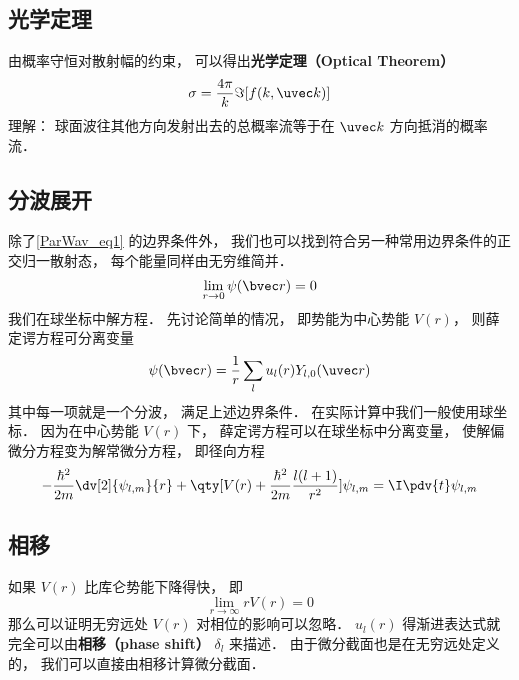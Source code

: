 \subsection{光学定理}
由概率守恒对散射幅的约束， 可以得出\textbf{光学定理（Optical Theorem）}
\begin{equation}
\sigma = \frac{4\pi}{k} \Im[f(k, \uvec k)]
\end{equation}
理解： 球面波往其他方向发射出去的总概率流等于在 $\uvec k$ 方向抵消的概率流．

\subsection{分波展开}

除了\autoref{ParWav_eq1} 的边界条件外， 我们也可以找到符合另一种常用边界条件的正交归一散射态， 每个能量同样由无穷维简并．
\begin{equation}
\lim_{r\to 0} \psi(\bvec r) = 0
\end{equation}
我们在球坐标中解方程． 先讨论简单的情况， 即势能为中心势能 $V(r)$， 则薛定谔方程可分离变量 %
\begin{equation}
\psi(\bvec r) = \frac{1}{r} \sum_l u_l(r) Y_{l,0}(\uvec r)
\end{equation}
其中每一项就是一个分波， 满足上述边界条件． 在实际计算中我们一般使用球坐标． 因为在中心势能 $V(r)$ 下， 薛定谔方程可以在球坐标中分离变量， 使解偏微分方程变为解常微分方程， 即径向方程 %
\begin{equation}
-\frac{\hbar^2}{2m} \dv[2]{\psi_{l,m}}{r} + \qty[V(r) + \frac{\hbar^2}{2m}\frac{l(l + 1)}{r^2}]\psi_{l,m} = \I \pdv{t} \psi_{l,m}
\end{equation}

\subsection{相移}
如果 $V(r)$ 比库仑势能下降得快， 即
\begin{equation}
\lim_{r\to\infty} r V(r) = 0
\end{equation}
那么可以证明无穷远处 $V(r)$ 对相位的影响可以忽略． $u_l(r)$ 得渐进表达式就完全可以由\textbf{相移（phase shift）} $\delta_l$ 来描述． 由于微分截面也是在无穷远处定义的， 我们可以直接由相移计算微分截面．

